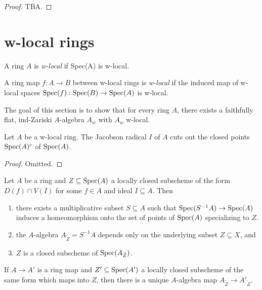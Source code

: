 \begin{proof}
  TBA.
\end{proof}

\section{w-local rings}

\begin{definition}
    A ring \(A\) is \emph{w-local} if Spec(A) is w-local.
    \label{def:w-local-ring}
    \leanok
\end{definition}

\begin{definition}
    A ring map \(f: A \to B\) between w-local rings is \emph{w-local} if the induced map of w-local spaces \(\operatorname{Spec}(f) : \operatorname{Spec}(B) \to \operatorname{Spec}(A)\) is w-local.
    \label{def:w-local-ring-map}
\end{definition}

The goal of this section is to show that for every ring $A$, there exists a faithfully flat, ind-Zariski $A$-algebra $A_{w}$ with $A_w$ w-local.

\begin{lemma}%
  \label{thm:w-local-jacobson-radical}
  Let $A$ be a w-local ring. The Jacobson radical \(I\) of \(A\) cuts out the closed points \(\operatorname{Spec}(A)^c\) of \(\operatorname{Spec}(A)\).
\end{lemma}

\begin{proof}
  Omitted.
\end{proof}

\begin{lemma}
    Let $A$ be a ring and $Z \subseteq \mathrm{Spec}(A)$ a locally closed subscheme of the form
    $D(f) \cap V(I)$ for some $f \in A$ and ideal $I \subseteq A$. Then
    \begin{enumerate}
        \item there exists a multiplicative subset $S \subseteq A$ such that $\mathrm{Spec}(S^{-1} A) \to \mathrm{Spec}(A)$ induces
            a homeomorphism onto the set of points of $\mathrm{Spec}(A)$ specializing to $Z$.
        \item the $A$-algebra $A_{\tilde{Z}} = S^{-1} A$ depends only on the underlying subset $Z \subseteq X$, and
        \item $Z$ is a closed subscheme of $\mathrm{Spec}(A_{\tilde{Z}})$.
    \end{enumerate}
    If $A \to A'$ is a ring map and $Z' \subseteq \mathrm{Spec}(A')$ a locally closed subscheme of the same form
    which maps into $Z$, then there is a unique $A$-algebra map $A_{\tilde{Z}} \to A'_{\tilde{Z}}$.
    \label{lemma:locally-closed-specializations}
\end{lemma}

